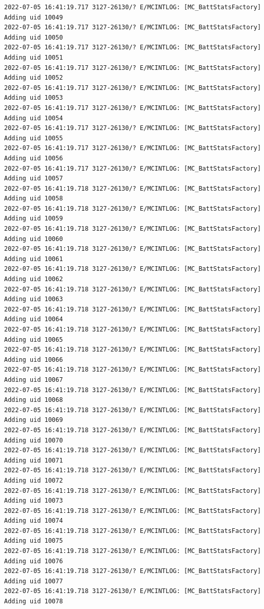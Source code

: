 \documentclass[a4paper,12pt]{book}
\begin{document}
\begin{lstlisting}
2022-07-05 16:41:19.717 3127-26130/? E/MCINTLOG: [MC_BattStatsFactory] Adding uid 10049
2022-07-05 16:41:19.717 3127-26130/? E/MCINTLOG: [MC_BattStatsFactory] Adding uid 10050
2022-07-05 16:41:19.717 3127-26130/? E/MCINTLOG: [MC_BattStatsFactory] Adding uid 10051
2022-07-05 16:41:19.717 3127-26130/? E/MCINTLOG: [MC_BattStatsFactory] Adding uid 10052
2022-07-05 16:41:19.717 3127-26130/? E/MCINTLOG: [MC_BattStatsFactory] Adding uid 10053
2022-07-05 16:41:19.717 3127-26130/? E/MCINTLOG: [MC_BattStatsFactory] Adding uid 10054
2022-07-05 16:41:19.717 3127-26130/? E/MCINTLOG: [MC_BattStatsFactory] Adding uid 10055
2022-07-05 16:41:19.717 3127-26130/? E/MCINTLOG: [MC_BattStatsFactory] Adding uid 10056
2022-07-05 16:41:19.717 3127-26130/? E/MCINTLOG: [MC_BattStatsFactory] Adding uid 10057
2022-07-05 16:41:19.718 3127-26130/? E/MCINTLOG: [MC_BattStatsFactory] Adding uid 10058
2022-07-05 16:41:19.718 3127-26130/? E/MCINTLOG: [MC_BattStatsFactory] Adding uid 10059
2022-07-05 16:41:19.718 3127-26130/? E/MCINTLOG: [MC_BattStatsFactory] Adding uid 10060
2022-07-05 16:41:19.718 3127-26130/? E/MCINTLOG: [MC_BattStatsFactory] Adding uid 10061
2022-07-05 16:41:19.718 3127-26130/? E/MCINTLOG: [MC_BattStatsFactory] Adding uid 10062
2022-07-05 16:41:19.718 3127-26130/? E/MCINTLOG: [MC_BattStatsFactory] Adding uid 10063
2022-07-05 16:41:19.718 3127-26130/? E/MCINTLOG: [MC_BattStatsFactory] Adding uid 10064
2022-07-05 16:41:19.718 3127-26130/? E/MCINTLOG: [MC_BattStatsFactory] Adding uid 10065
2022-07-05 16:41:19.718 3127-26130/? E/MCINTLOG: [MC_BattStatsFactory] Adding uid 10066
2022-07-05 16:41:19.718 3127-26130/? E/MCINTLOG: [MC_BattStatsFactory] Adding uid 10067
2022-07-05 16:41:19.718 3127-26130/? E/MCINTLOG: [MC_BattStatsFactory] Adding uid 10068
2022-07-05 16:41:19.718 3127-26130/? E/MCINTLOG: [MC_BattStatsFactory] Adding uid 10069
2022-07-05 16:41:19.718 3127-26130/? E/MCINTLOG: [MC_BattStatsFactory] Adding uid 10070
2022-07-05 16:41:19.718 3127-26130/? E/MCINTLOG: [MC_BattStatsFactory] Adding uid 10071
2022-07-05 16:41:19.718 3127-26130/? E/MCINTLOG: [MC_BattStatsFactory] Adding uid 10072
2022-07-05 16:41:19.718 3127-26130/? E/MCINTLOG: [MC_BattStatsFactory] Adding uid 10073
2022-07-05 16:41:19.718 3127-26130/? E/MCINTLOG: [MC_BattStatsFactory] Adding uid 10074
2022-07-05 16:41:19.718 3127-26130/? E/MCINTLOG: [MC_BattStatsFactory] Adding uid 10075
2022-07-05 16:41:19.718 3127-26130/? E/MCINTLOG: [MC_BattStatsFactory] Adding uid 10076
2022-07-05 16:41:19.718 3127-26130/? E/MCINTLOG: [MC_BattStatsFactory] Adding uid 10077
2022-07-05 16:41:19.718 3127-26130/? E/MCINTLOG: [MC_BattStatsFactory] Adding uid 10078

\end{lstlisting}
\end{document}
